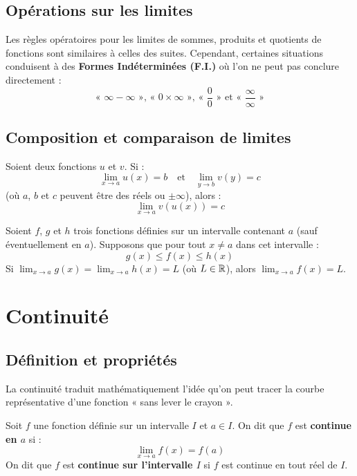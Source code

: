 \subsection{Opérations sur les limites}

Les règles opératoires pour les limites de sommes, produits et quotients de fonctions sont similaires à celles des suites. Cependant, certaines situations conduisent à des \textbf{Formes Indéterminées (F.I.)} où l'on ne peut pas conclure directement :
\[
\text{« } \infty - \infty \text{ », « } 0 \times \infty \text{ », « } \frac{0}{0} \text{ » \ et \ « } \frac{\infty}{\infty} \text{ »}
\]

\subsection{Composition et comparaison de limites}

\begin{theoreme}
Soient deux fonctions $u$ et $v$. Si :
\[
\lim_{x \to a} u(x) = b \quad \text{et} \quad \lim_{y \to b} v(y) = c
\]
(où $a$, $b$ et $c$ peuvent être des réels ou $\pm\infty$), alors :
\[
\lim_{x \to a} v(u(x)) = c
\]
\end{theoreme}

\begin{theoreme}
Soient $f$, $g$ et $h$ trois fonctions définies sur un intervalle contenant $a$ (sauf éventuellement en $a$). Supposons que pour tout $x \ne a$ dans cet intervalle :
\[
g(x) \le f(x) \le h(x)
\]
Si $\lim_{x \to a} g(x) = \lim_{x \to a} h(x) = L$ (où $L \in \mathbb{R}$), alors $\lim_{x \to a} f(x) = L$.
\end{theoreme}

\section{Continuité}

\subsection{Définition et propriétés}

La continuité traduit mathématiquement l'idée qu'on peut tracer la courbe représentative d'une fonction « sans lever le crayon ».

\begin{definition}
Soit $f$ une fonction définie sur un intervalle $I$ et $a \in I$.
On dit que $f$ est \textbf{continue en $a$} si :
\[
\lim_{x \to a} f(x) = f(a)
\]
On dit que $f$ est \textbf{continue sur l'intervalle $I$} si $f$ est continue en tout réel de $I$.
\end{definition}

